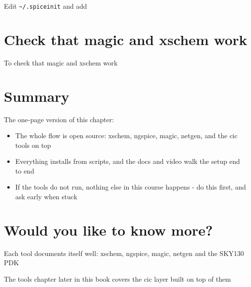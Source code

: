 Edit \texttt{\textasciitilde{}/.spiceinit} and add

\begin{Shaded}
\begin{Highlighting}[]
\KeywordTok{;} 
\KeywordTok{;} 
\KeywordTok{;} 
\end{Highlighting}
\end{Shaded}

\section{Check that magic and xschem
work}\label{check-that-magic-and-xschem-work}

To check that magic and xschem work

\begin{Shaded}
\begin{Highlighting}[]
\KeywordTok{\&}
 \KeywordTok{\&}
\end{Highlighting}
\end{Shaded}

\section{Summary}\label{summary}

The one-page version of this chapter:

\begin{itemize}
\tightlist
\item
  The whole flow is open source: xschem, ngspice, magic, netgen, and the
  cic tools on top
\item
  Everything installs from scripts, and the docs and video walk the
  setup end to end
\item
  If the tools do not run, nothing else in this course happens - do this
  first, and ask early when stuck
\end{itemize}

\section{Would you like to know
more?}\label{would-you-like-to-know-more}

Each tool documents itself well: xschem, ngspice, magic, netgen and the
SKY130 PDK

The tools chapter later in this book covers the cic layer built on top
of them
